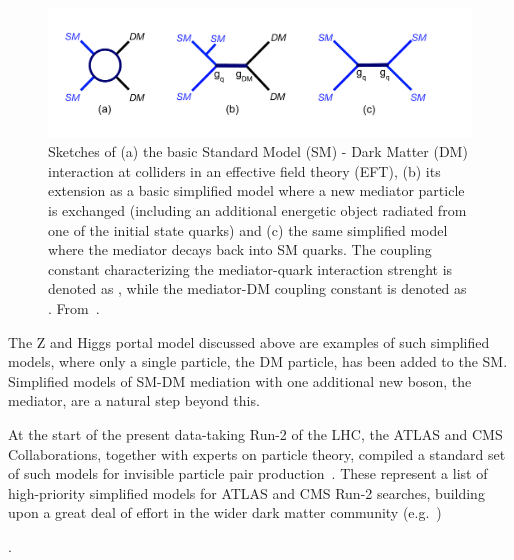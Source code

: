 
\begin{figure}[!htpb]
\includegraphics[width=\textwidth]{figures/MonoX.pdf}
\caption{Sketches of (a) the basic Standard Model (SM) - Dark Matter (DM) interaction at colliders in an effective field theory (EFT), (b) its extension as a basic simplified model where a new mediator particle is exchanged (including an additional energetic object radiated from one of the initial state quarks) and (c) the same simplified model where the mediator decays back into SM quarks. The coupling constant characterizing the mediator-quark interaction strenght is denoted as \gq, while the mediator-DM coupling constant is denoted as \gdm. From~\cite{monoXfig}.}
\label{fig:monoX}
\end{figure}

The Z and Higgs portal model discussed above are examples of such simplified models, where only a single particle, the DM particle, has been added to the SM. 
Simplified models of SM-DM mediation with one additional new boson, the mediator, are a natural step beyond this. 

At the start of the present data-taking Run-2 of the LHC, the ATLAS and CMS Collaborations, together with experts on particle theory, compiled a standard set of such models for invisible particle pair production~\cite{Abercrombie:2015wmb}. These represent a list of high-priority simplified models for ATLAS and CMS Run-2 searches, building upon a great deal of effort in the wider dark matter community (e.g.~\cite{Fox:2011pm,Yavin:14092893,Malik:2014ggr,Abdallah:2015ter}) 
\begin{marginnote}[]
\end{marginnote}. 

